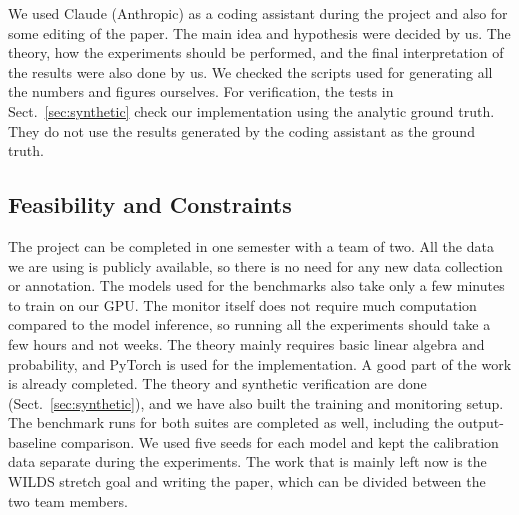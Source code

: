\documentclass[graybox]{SNmult}
\begin{document}
We used Claude (Anthropic) as a coding assistant during the project and also for some editing of the paper. The main idea and hypothesis were decided by us. The theory, how the experiments should be performed, and the final interpretation of the results were also done by us. We checked the scripts used for generating all the numbers and figures ourselves. For verification, the tests in
Sect.~\ref{sec:synthetic} check our implementation using the analytic ground truth. They do not use the results generated by the coding assistant as the ground truth.

\subsection{Feasibility and Constraints}

The project can be completed in one semester with a team of two. All the data we are using is publicly available, so there is no need for any new data collection or annotation. The models used for the benchmarks also take only a few minutes to train on our GPU. The monitor itself does not require much computation compared to the model inference, so running all the experiments should take a few hours and not weeks.
The theory mainly requires basic linear algebra and probability, and PyTorch is used for the implementation. A good part of the work is already completed. The theory and synthetic verification are done
(Sect.~\ref{sec:synthetic}), and we have also built the training and monitoring setup. The benchmark runs for both suites are completed as well, including the output-baseline comparison. We used five seeds for each model and kept the calibration data separate during the experiments. The work that is mainly left now is the WILDS stretch goal and writing the paper, which can be divided between the two team members.
\end{document}
